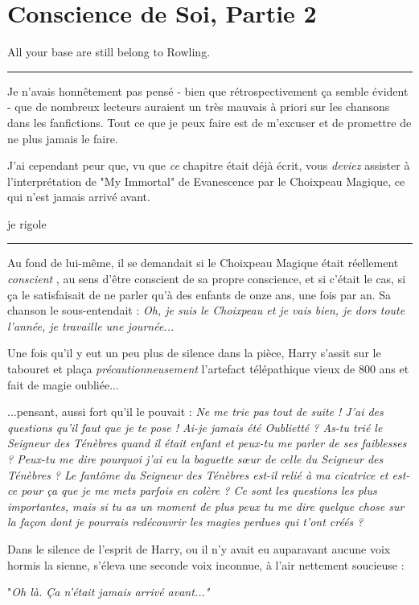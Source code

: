 
\chapter{Conscience de Soi, Partie 2}

All your base are still belong to Rowling.
\par\noindent\rule{\textwidth}{0.4pt}
Je n'avais honnêtement pas pensé - bien que rétrospectivement ça semble évident - que de nombreux lecteurs auraient un très mauvais à priori sur les chansons dans les fanfictions. Tout ce que je peux faire est de m'excuser et de promettre de ne plus jamais le faire.

J'ai cependant peur que, vu que \emph{ce}  chapitre était déjà écrit, vous \emph{deviez}  assister à l'interprétation de "My Immortal" de Evanescence par le Choixpeau Magique, ce qui n'est jamais arrivé avant.

je rigole
\par\noindent\rule{\textwidth}{0.4pt}
Au fond de lui-même, il se demandait si le Choixpeau Magique était réellement \emph{conscient} , au sens d'être conscient de sa propre conscience, et si c'était le cas, si ça le satisfaisait de ne parler qu'à des enfants de onze ans, une fois par an. Sa chanson le sous-entendait : \emph{Oh, je suis le Choixpeau et je vais bien, je dors toute l'année, je travaille une journée...} 

Une fois qu'il y eut un peu plus de silence dans la pièce, Harry s'assit sur le tabouret et plaça \emph{précautionneusement}  l'artefact télépathique vieux de 800 ans et fait de magie oubliée...

...pensant, aussi fort qu'il le pouvait : \emph{Ne me trie pas tout de suite ! J'ai des questions qu'il faut que je te pose ! Ai-je jamais été Oublietté ? As-tu trié le Seigneur des Ténèbres quand il était enfant et peux-tu me parler de ses faiblesses ? Peux-tu me dire pourquoi j'ai eu la baguette sœur de celle du Seigneur des Ténèbres ? Le fantôme du Seigneur des Ténèbres est-il relié à ma cicatrice et est-ce pour ça que je me mets parfois en colère ? Ce sont les questions les plus importantes, mais si tu as un moment de plus peux tu me dire quelque chose sur la façon dont je pourrais redécouvrir les magies perdues qui t'ont créés ?} 

Dans le silence de l'esprit de Harry, ou il n'y avait eu auparavant aucune voix hormis la sienne, s'éleva une seconde voix inconnue, à l'air nettement soucieuse :

"\emph{Oh là. Ça n'était jamais arrivé avant..."} 

